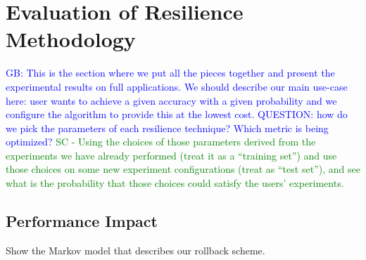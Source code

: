 \documentclass{sig-alternate}
\newcommand{\sui}[1]{%
  \textcolor{green}{SC - #1}
}
\newcommand{\greg}[1]{%
  \textcolor{blue}{GB: #1}
}
\begin{document}
%
\section{Evaluation of Resilience Methodology}
\label{sec:eval}

\greg{This is the section where we put all the pieces together and present the experimental results on full applications. We should describe our main use-case here: user wants to achieve a given accuracy with a given probability and we configure the algorithm to provide this at the lowest cost. QUESTION: how do we pick the parameters of each resilience technique? Which metric is being optimized?} \sui{Using the choices of those parameters derived from the experiments we have already performed (treat it as a ``training set'') and use those choices on some new experiment configurations (treat as ``test set''), and see what is the probability that those choices could satisfy the users' experiments.}

\subsection{Performance Impact}
\label{sec:eval:perf}

Show the Markov model that describes our rollback scheme.
\end{document}
